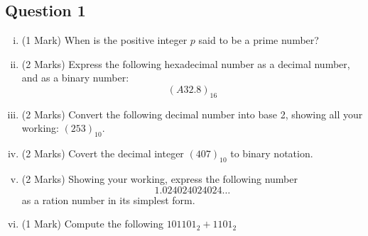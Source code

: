 
\subsection*{Question 1}

\begin{enumerate}[(i)]
\item (1 Mark) When is the positive integer $p$ said to be a prime number?
\item (2 Marks) Express the following hexadecimal number as a decimal number, and as a binary number: \[(A32.8)_{16}\]

\item (2 Marks) Convert the following decimal number into base 2, showing all your working: $(253)_{10}$. 
\item (2 Marks) Covert the decimal integer $(407)_{10}$ to binary notation.

\item (2 Marks) Showing your working, express the following number 
\[ 1.024024024024\ldots\]
as a ration number in its simplest form.
\item (1 Mark) Compute the following $101101_2 + 1101_2$ 
\end{enumerate}

